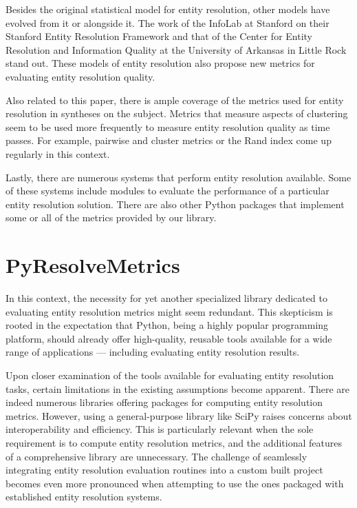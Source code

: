 \documentclass[a4paper,twoside]{article}
\begin{document}
    Besides the original statistical model for entity resolution, other models
    have evolved from it or alongside it.
    The work of the InfoLab at Stanford on their Stanford Entity Resolution
    Framework\cite{Ben2009Swoosh} and that of the Center for Entity Resolution
    and Information Quality at the University of Arkansas in Little
    Rock\cite{tal2007algebraic} stand out.
    These models of entity resolution also propose new metrics for evaluating
    entity resolution quality\cite{Men10,Tal11}.

    Also related to this paper, there is ample coverage of the metrics used for
    entity resolution in syntheses on the subject\cite{vldb2010,hitesh2012,Tal11}.
    Metrics that measure aspects of clustering seem to be used more frequently
    to measure entity resolution quality as time passes.
    For example, pairwise and cluster metrics\cite{Men10, huang2006efficient} or
    the Rand index\cite{tal2007algebraic} come up regularly in this context.

    Lastly, there are numerous systems that perform entity resolution available.
    Some of these systems include modules to evaluate the performance of a
    particular entity resolution solution\cite{fever2009,magellan2020,oyster2012}.
    There are also other Python packages that implement some or all of the
    metrics provided by our library\cite{nmeth2020scipy,ereval}.

    \section{PyResolveMetrics}\label{sec:library}

    In this context, the necessity for yet another specialized library dedicated
    to evaluating entity resolution metrics might seem redundant.
    This skepticism is rooted in the expectation that Python, being a highly
    popular programming platform, should already offer high-quality, reusable
    tools available for a wide range of applications --- including evaluating
    entity resolution results.
    
    Upon closer examination of the tools available for evaluating entity
    resolution tasks, certain limitations in the existing assumptions become
    apparent.
    There are indeed numerous libraries offering packages for computing entity
    resolution metrics.
    However, using a general-purpose library like SciPy raises concerns about
    interoperability and efficiency.
    This is particularly relevant when the sole requirement is to compute entity
    resolution metrics, and the additional features of a comprehensive library
    are unnecessary.
    The challenge of seamlessly integrating entity resolution evaluation
    routines into a custom built project becomes even more pronounced when
    attempting to use the ones packaged with established entity resolution
    systems\cite{oyster2012,jedai2017,deepm2020,magellan2020}.
    
\end{document}
